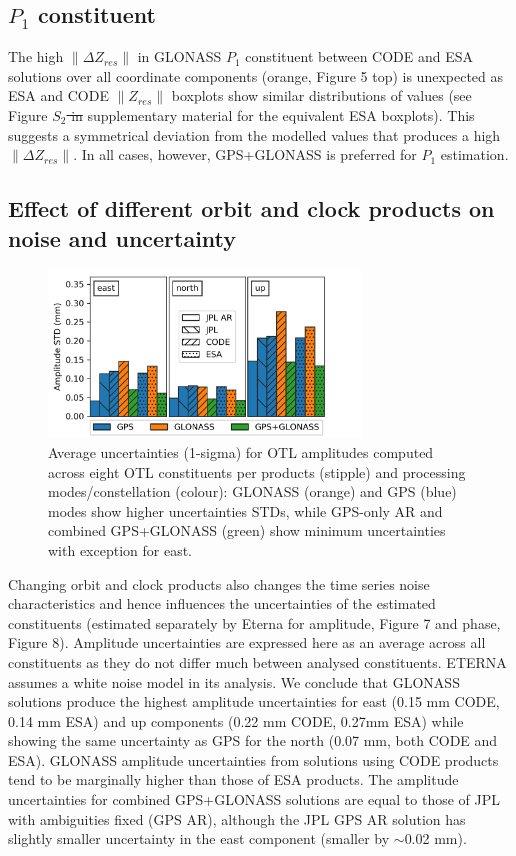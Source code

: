 \documentclass[se, manuscript]{copernicus}
\providecommand{\DIFadd}[1]{{\protect\color{blue}\uwave{#1}}} %
\providecommand{\DIFdel}[1]{{\protect\color{red}\sout{#1}}}                      %
\providecommand{\DIFaddbegin}{} %
\providecommand{\DIFaddend}{} %
\providecommand{\DIFdelbegin}{} %
\providecommand{\DIFdelend}{} %
\begin{document}
\subsection{$P_1$ constituent}
The high $\|\Delta Z_{res}\|$ in GLONASS $P_1$ constituent between CODE and ESA solutions over all coordinate components (orange, Figure 5 top) is unexpected as ESA and CODE $\|Z_{res}\|$ boxplots show similar distributions of values (see Figure \DIFdelbegin \DIFdel{$S_2$ in }\DIFdelend \DIFaddbegin \DIFadd{S2 in the }\DIFaddend supplementary material for the equivalent ESA boxplots). This suggests a symmetrical deviation from the modelled values that produces a high $\|\Delta Z_{res}\|$. In all cases, however, GPS+GLONASS is preferred for $P_1$ estimation.

\subsection{Effect of different orbit and clock products on noise and uncertainty}

\begin{figure}[t]
\includegraphics[width=8.3cm]{fig07.png}
\caption{Average uncertainties (1-sigma) for OTL amplitudes computed across eight OTL constituents per products (stipple) and processing modes/constellation (colour): GLONASS (orange) and GPS (blue) modes show higher uncertainties STDs, while GPS-only AR and combined GPS+GLONASS (green) show minimum uncertainties with exception for east.}
\end{figure}

Changing orbit and clock products also changes the time series noise characteristics and hence influences the uncertainties of the estimated constituents (estimated separately by Eterna for amplitude, Figure 7 and phase, Figure 8). Amplitude uncertainties are expressed here as an average across all constituents as they do not differ much between analysed constituents. ETERNA assumes a white noise model in its analysis. We conclude that GLONASS solutions produce the highest amplitude uncertainties for east (0.15 mm CODE, 0.14 mm ESA) and up components (0.22 mm CODE, 0.27mm ESA) while showing the same uncertainty as GPS for the north (0.07 mm, both CODE and ESA). GLONASS amplitude uncertainties from solutions using CODE products tend to be marginally higher than those of ESA products. The amplitude uncertainties for combined GPS+GLONASS solutions are equal to those of JPL with ambiguities fixed (GPS AR), although the JPL GPS AR solution has slightly smaller uncertainty in the east component (smaller by $\sim$0.02 mm).
\end{document}

